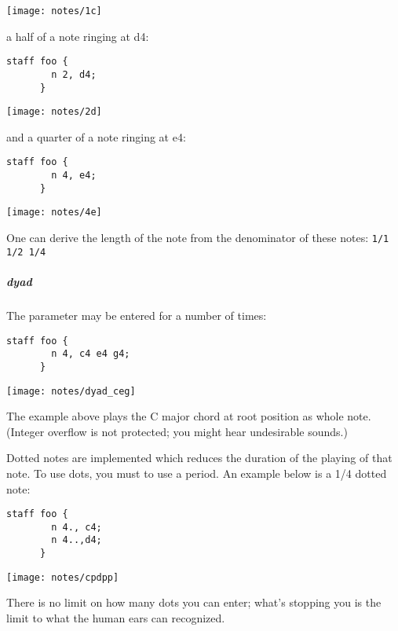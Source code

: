 \begin{center}
\texttt{[image: notes/1c]}
\end{center}

a half of a note ringing at d4:

\begin{Verbatim}[frame=single]
      staff foo {
        n 2, d4;
      }
\end{Verbatim}

\begin{center}
\texttt{[image: notes/2d]}
\end{center}

and a quarter of a note ringing at e4:
\begin{Verbatim}[frame=single]
      staff foo {
        n 4, e4;
      }
\end{Verbatim}

\begin{center}
\texttt{[image: notes/4e]}
\end{center}

\np One can derive the length of the note from the denominator of these notes:
\verb+1/1 1/2 1/4+

\subparagraph{dyad}
The parameter  may be entered for a number of times:

\begin{Verbatim}[frame=single]
      staff foo {
        n 4, c4 e4 g4;
      }
\end{Verbatim}

\begin{center}
\texttt{[image: notes/dyad\_ceg]}
\end{center}

\np The example above plays the C major chord at root position as whole note. (Integer overflow is not
protected; you might hear undesirable sounds.)

\np Dotted notes are implemented which reduces the duration of the playing of
that note. To use dots, you must to use a period. An example below is a 1/4 dotted note:
\begin{Verbatim}[frame=single]
      staff foo {
        n 4., c4;
        n 4..,d4;
      }
\end{Verbatim}

\begin{center}
\texttt{[image: notes/cpdpp]}
\end{center}

\np There is no limit on how many dots you can enter; what's stopping you
is the limit to what the human ears can recognized.

